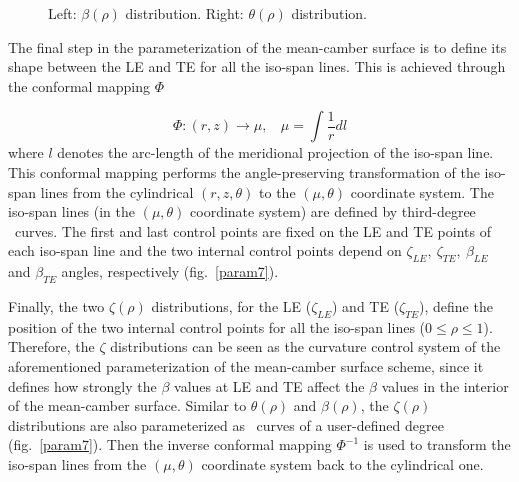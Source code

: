 \begin{figure}[h!]
\begin{minipage}[b]{1\linewidth}
 \centering
\end{minipage}
\caption{Left: $\beta(\rho)$ distribution. Right: $\theta(\rho)$ distribution.}
\label{param4}
\end{figure}

The final step in the parameterization of the mean-camber surface is to define its shape between the LE and TE for all the iso-span lines. This is achieved through the conformal mapping $\Phi$


\begin{equation} 
   \Phi:(r,z)\rightarrow \mu, ~~~~\mu=\int{\frac{1}{r}dl}
   \label{phi1} 
\end{equation}
where $l$ denotes the arc-length of the meridional projection of the iso-span line. This conformal mapping performs the angle-preserving transformation of the iso-span lines from the cylindrical  $(r,z,\theta)$ to the $(\mu,\theta)$ coordinate system. The iso-span lines (in the $(\mu,\theta)$ coordinate system) are defined by third-degree \Bezier\ curves. The first and last control points are fixed on the LE and TE points of each iso-span line and the two internal control points depend on $\zeta_{LE}, ~\zeta_{TE}, ~\beta_{LE}$ and $\beta_{TE}$ angles, respectively (fig.\ \ref{param7}).
  
Finally, the two $\zeta(\rho)$ distributions, for the LE ($\zeta_{LE}$) and TE ($\zeta_{TE}$), define the position of the two internal control points for all the iso-span lines ($0\leq\rho\leq1$). Therefore, the $\zeta$ distributions can be seen as the curvature control system of the aforementioned parameterization of the mean-camber surface scheme, since it defines how strongly the $\beta$ values at LE and TE affect the $\beta$ values in the interior of the mean-camber surface. Similar to $\theta(\rho)$ and $\beta(\rho)$, the $\zeta(\rho)$ distributions are also parameterized as \Bezier\ curves of a user-defined degree (fig.\ \ref{param7}). Then the  inverse conformal mapping $\Phi^{-1}$ is used to transform the iso-span lines from the $(\mu,\theta)$ coordinate system back to the cylindrical one. 

